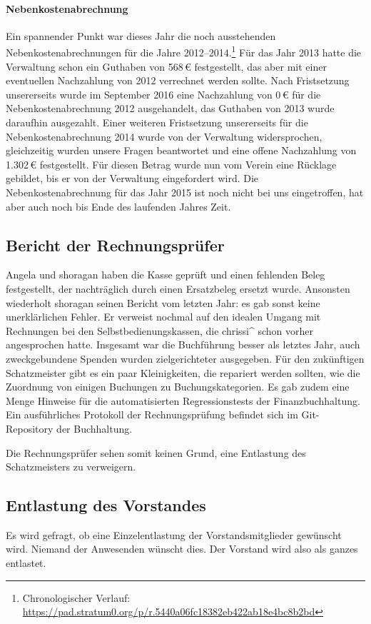 \documentclass[parskip=half-]{s0minutes}
\begin{document}
\paragraph{Nebenkostenabrechnung} Ein spannender Punkt war dieses Jahr die noch
ausstehenden Nebenkostenabrechnungen für die Jahre
2012--2014.\footnote{Chronologischer Verlauf:
\url{https://pad.stratum0.org/p/r.5440a06fc18382eb422ab18e4bc8b2bd}} Für das
Jahr 2013 hatte die Verwaltung schon ein Guthaben von 568\,€ festgestellt, das
aber mit einer eventuellen Nachzahlung von 2012 verrechnet werden sollte. Nach
Fristsetzung unsererseits wurde im September 2016 eine Nachzahlung von 0\,€ für
die Nebenkostenabrechnung 2012 ausgehandelt, das Guthaben von 2013 wurde
daraufhin ausgezahlt. Einer weiteren Fristsetzung unsererseits für die
Nebenkostenabrechnung 2014 wurde von der Verwaltung widersprochen, gleichzeitig
wurden unsere Fragen beantwortet und eine offene Nachzahlung von 1{.}302\,€
festgestellt. Für diesen Betrag wurde nun vom Verein eine Rücklage gebildet, bis
er von der Verwaltung eingefordert wird. Die Nebenkostenabrechnung für das Jahr
2015 ist noch nicht bei uns eingetroffen, hat aber auch noch bis Ende des
laufenden Jahres Zeit.

\subsection{Bericht der Rechnungsprüfer}
Angela und shoragan haben die Kasse geprüft und einen fehlenden Beleg
festgestellt, der nachträglich durch einen Ersatzbeleg ersetzt wurde.
Ansonsten wiederholt shoragan seinen Bericht vom letzten Jahr: es gab sonst
keine unerklärlichen Fehler. Er verweist nochmal auf den idealen Umgang mit
Rechnungen bei den Selbstbedienungskassen, die chrissi\^{} schon vorher
angesprochen hatte. Insgesamt war die Buchführung besser als letztes Jahr, auch
zweckgebundene Spenden wurden zielgerichteter ausgegeben. Für den zukünftigen
Schatzmeister gibt es ein paar Kleinigkeiten, die repariert werden sollten, wie
die Zuordnung von einigen Buchungen zu Buchungskategorien. Es gab zudem eine
Menge Hinweise für die automatisierten Regressionstests der Finanzbuchhaltung.
Ein ausführliches Protokoll der Rechnungsprüfung befindet sich im Git-Repository
der Buchhaltung.

Die Rechnungsprüfer sehen somit keinen Grund, eine Entlastung des Schatzmeisters
zu verweigern.

\subsection{Entlastung des Vorstandes}
Es wird gefragt, ob eine Einzelentlastung der Vorstandsmitglieder gewünscht
wird. Niemand der Anwesenden wünscht dies. Der Vorstand wird also als ganzes
entlastet.
\end{document}
